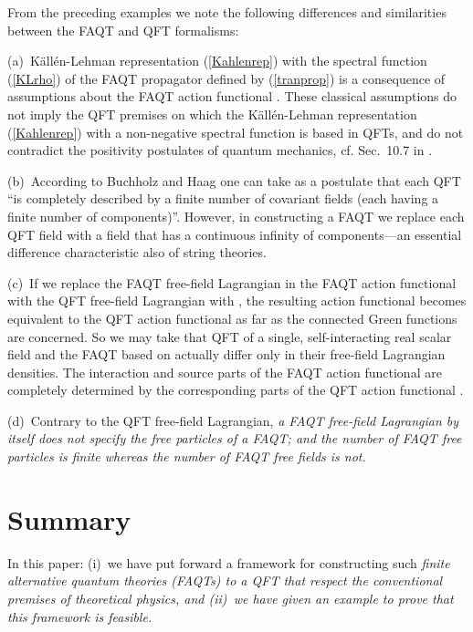 \documentclass[a4paper,12pt]{article}
\providecommand{\polje}{\phi}
\providecommand{\polA}{\polje_A}
\providecommand{\akcija}{I}
\providecommand{\akcijaA}{\akcija_A}
\providecommand{\Lag}{{\cal L}}
\providecommand{\Lagf}{\Lag_{0}}
\providecommand{\LagAf}{\Lag_{A0}}
\providecommand{\prop}{\widetilde{\Delta}}
\providecommand{\propA}{\prop_A}
\begin{document}
From the preceding examples we note the following differences and similarities between the FAQT and QFT formalisms:

(a)~K\"all\'en-Lehman representation (\ref{Kahlenrep}) with the spectral function (\ref{KLrho}) of the FAQT propagator \myHighlight{$\propA$}\coordHE{} defined by (\ref{tranprop}) is a consequence of assumptions about the FAQT action functional \coordHE{}. These classical  assumptions do not imply the QFT premises on which the K\"all\'en-Lehman representation (\ref{Kahlenrep}) with a non-negative spectral function is based in QFTs, and do not contradict the positivity postulates of quantum mechanics, cf. Sec.~10.7 in \cite{Weinberg}.

(b)~According to Buchholz and Haag \cite{Buchholz} one can take as a postulate that each QFT ``is completely described by a finite number of covariant fields (each having a finite number of components)''. However, in constructing a FAQT we replace  each QFT field with a field that has a continuous infinity of components---an essential difference characteristic also of string theories.

(c)~If we replace the FAQT free-field Lagrangian \myHighlight{$\LagAf$}\coordHE{} in the FAQT action functional \myHighlight{$\akcijaA$}\coordHE{} with the QFT  free-field Lagrangian \myHighlight{$\Lagf$}\coordHE{} with \myHighlight{$\polje=\polA$}\coordHE{}, the resulting action functional becomes equivalent to the QFT action functional \myHighlight{$\akcija$}\coordHE{} as far as the connected Green functions are concerned. So we may take that QFT of a single, self-interacting real scalar field and the FAQT based on \myHighlight{$\akcijaA$}\coordHE{} actually differ only in their free-field Lagrangian densities. The interaction and source parts of the FAQT action functional \myHighlight{$\akcijaA$}\coordHE{} are completely determined by the corresponding parts of the QFT action functional \myHighlight{$\akcija$}\coordHE{}.

(d)~Contrary to the QFT free-field Lagrangian, \it a FAQT free-field Lagrangian by itself does not specify the free particles of a FAQT; \rm and the number of FAQT free particles is finite whereas the number of FAQT free fields is not.

\section{Summary}
\label{secsummary}

In this paper: (i)~we have put forward a framework for constructing such \it finite alternative quantum theories \rm (FAQTs) to a QFT that respect \it the conventional premises of theoretical physics, \rm and (ii)~we have given an example to prove that this framework is feasible.
\end{document}
